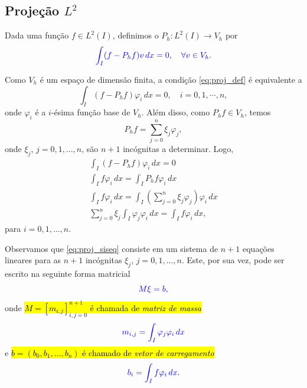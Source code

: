 \subsection{Projeção $L^2$}\label{subsec:projecao_1d}

Dada uma função $f\in L^2(I)$, definimos o  $P_h:L^2(I)\to V_h$ por
\begin{equation}\label{eq:proj_def}\color{blue}\int_I (f-P_hf)v\,dx=0,\quad\forall v\in V_h.
\end{equation}

Como $V_h$ é um espaço de dimensão finita, a condição \eqref{eq:proj_def} é equivalente a
\begin{equation}\label{eq:proj_def}
  \int_I (f-P_hf)\varphi_i\,dx=0,\quad i=0, 1, \cdots, n,
\end{equation}
onde $\varphi_i$ é a $i$-ésima função base de $V_h$. Além disso, como $P_hf\in V_h$, temos
\begin{equation}
  P_hf = \sum_{j=0}^n\xi_j\varphi_j,
\end{equation}
onde $\xi_j$, $j=0, 1, \dotsc, n$, são $n+1$ incógnitas a determinar. Logo,
\begin{gather}
  \int_I (f-P_hf)\varphi_i\,dx=0 \\
  \int_I f\varphi_i\,dx = \int_I P_hf\varphi_i\,dx\\
  \int_I f\varphi_i\,dx = \int_I \left(\sum_{j=0}^n \xi_j\varphi_j\right)\varphi_i\,dx\\
  \sum_{j=0}^n \xi_j\int_I\varphi_j\varphi_i\,dx = \int_I f\varphi_i\,dx,\label{eq:proj_siseq}
\end{gather}
para $i=0, 1, \dotsc, n$.

Observamos que \eqref{eq:proj_siseq} consiste em um sistema de $n+1$ equações lineares para as $n+1$ incógnitas $\xi_j$, $j=0, 1, \dotsc, n$. Este, por sua vez, pode ser escrito na seguinte forma matricial
\begin{equation}\label{eq:proj_sis}\color{blue}M\xi = b,
\end{equation}
onde \hl{$M = [m_{i,j}]_{i,j=0}^{n+1}$ é chamada de \emph{matriz de massa}}
\begin{equation}\color{blue}m_{i,j} = \int_I\varphi_j\varphi_i\,dx
\end{equation}
e \hl{$b = (b_0, b_1, \dotsc, b_n)$ é chamado de \emph{vetor de carregamento}}
\begin{equation}\color{blue}b_i = \int_I f\varphi_i\,dx.
\end{equation}

